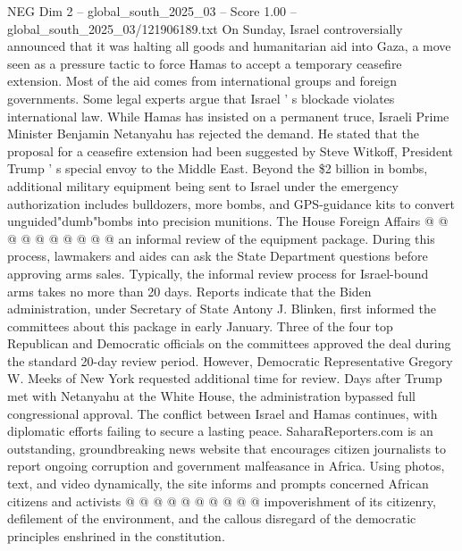 \begin{textsample}{NEG Dim 2 – global\_south\_2025\_03 – Score 1.00 – global\_south\_2025\_03/121906189.txt}
On Sunday, Israel controversially announced that it was halting all goods and humanitarian aid into Gaza, a move seen as a pressure tactic to force Hamas to accept a temporary ceasefire extension.
Most of the aid comes from international groups and foreign governments.
Some legal experts argue that Israel ' s blockade violates international law.
While Hamas has insisted on a permanent truce, Israeli Prime Minister Benjamin Netanyahu has rejected the demand.
He stated that the proposal for a ceasefire extension had been suggested by Steve Witkoff, President Trump ' s special envoy to the Middle East.
Beyond the \$2 billion in bombs, additional military equipment being sent to Israel under the emergency authorization includes bulldozers, more bombs, and GPS-guidance kits to convert unguided"dumb"bombs into precision munitions.
The House Foreign Affairs @ @ @ @ @ @ @ @ @ @ an informal review of the equipment package.
During this process, lawmakers and aides can ask the State Department questions before approving arms sales.
Typically, the informal review process for Israel-bound arms takes no more than 20 days.
Reports indicate that the Biden administration, under Secretary of State Antony J.
Blinken, first informed the committees about this package in early January.
Three of the four top Republican and Democratic officials on the committees approved the deal during the standard 20-day review period.
However, Democratic Representative Gregory W.
Meeks of New York requested additional time for review.
Days after Trump met with Netanyahu at the White House, the administration bypassed full congressional approval.
The conflict between Israel and Hamas continues, with diplomatic efforts failing to secure a lasting peace.
SaharaReporters.com is an outstanding, groundbreaking news website that encourages citizen journalists to report ongoing corruption and government malfeasance in Africa.
Using photos, text, and video dynamically, the site informs and prompts concerned African citizens and activists @ @ @ @ @ @ @ @ @ @ impoverishment of its citizenry, defilement of the environment, and the callous disregard of the democratic principles enshrined in the constitution.

\end{textsample}
